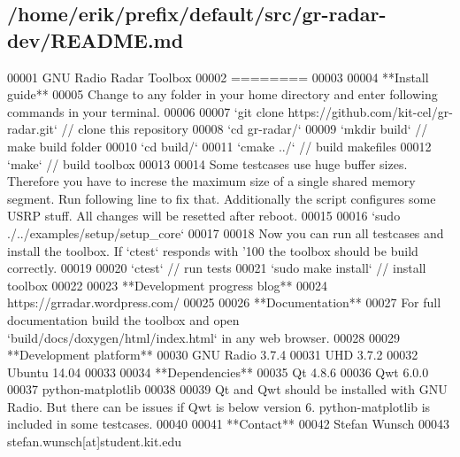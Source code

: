 \subsection{/home/erik/prefix/default/src/gr-\/radar-\/dev/\+R\+E\+A\+D\+ME.md}

\begin{DoxyCode}
00001 GNU Radio Radar Toolbox
00002 ========
00003 
00004 **Install guide**  
00005 Change to any folder in your home directory and enter following commands in your terminal.
00006 
00007 `git clone https://github.com/kit-cel/gr-radar.git` // clone this repository  
00008 `cd gr-radar/`  
00009 `mkdir build` // make build folder  
00010 `cd build/`  
00011 `cmake ../` // build makefiles  
00012 `make` // build toolbox 
00013 
00014 Some testcases use huge buffer sizes. Therefore you have to increse the maximum size of a single
       shared memory segment. Run following line to fix that. Additionally the script configures some USRP stuff. All
       changes will be resetted after reboot.
00015 
00016 `sudo ./../examples/setup/setup\_core`
00017 
00018 Now you can run all testcases and install the toolbox. If `ctest` responds with '100%
       the toolbox should be build correctly.
00019 
00020 `ctest` // run tests  
00021 `sudo make install` // install toolbox
00022 
00023 **Development progress blog**  
00024 https://grradar.wordpress.com/
00025 
00026 **Documentation**  
00027 For full documentation build the toolbox and open `build/docs/doxygen/html/index.html` in any web
       browser.
00028 
00029 **Development platform**  
00030 GNU Radio 3.7.4  
00031 UHD 3.7.2  
00032 Ubuntu 14.04
00033 
00034 **Dependencies**  
00035 Qt 4.8.6  
00036 Qwt 6.0.0  
00037 python-matplotlib  
00038 
00039 Qt and Qwt should be installed with GNU Radio. But there can be issues if Qwt is below version 6.
       python-matplotlib is included in some testcases.
00040 
00041 **Contact**  
00042 Stefan Wunsch  
00043 stefan.wunsch[at]student.kit.edu
\end{DoxyCode}
